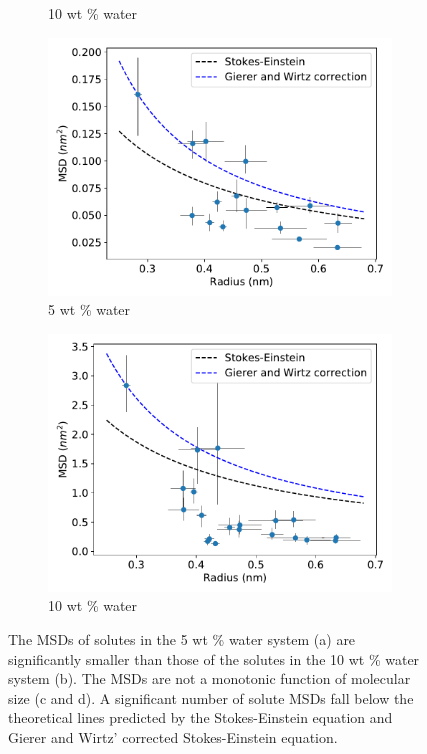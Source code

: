 \documentclass{article}
\begin{document}
\begin{figure}
\begin{subfigure}{0.45\textwidth}
  \caption{10 wt \% water}\label{fig:all_msds_10wt}
  \end{subfigure}
  \begin{subfigure}{0.45\textwidth}
  \includegraphics[width=\textwidth]{msd_radius_5wt.pdf} 
  \caption{5 wt \% water}\label{fig:msd_radius_5wt}
  \end{subfigure}
  \begin{subfigure}{0.45\textwidth}
  \includegraphics[width=\textwidth]{msd_radius_10wt.pdf} 
  \caption{10 wt \% water}\label{fig:msd_radius_10wt}
  \end{subfigure}
  \caption{The MSDs of solutes in the 5 wt \% water system (a) are significantly
  smaller than those of the solutes in the 10 wt \% water system (b). The
  MSDs are not a monotonic function of molecular size (c and d). A significant
  number of solute MSDs fall below the theoretical lines predicted by the 
  Stokes-Einstein equation and Gierer and Wirtz' corrected Stokes-Einstein equation.}\label{fig:msds}
  \end{figure}  
\end{document}
